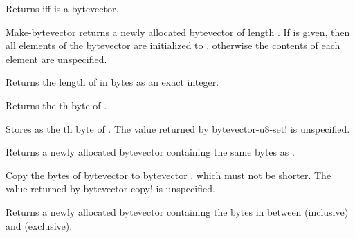 \begin{entry}{%
}

Returns \schtrue{} iff  is a bytevector.
\end{entry}

\begin{entry}{%
}

{\cf Make-bytevector} returns a newly allocated bytevector of
length .  If  is given, then all elements of the bytevector
are initialized to , otherwise the contents of each
element are unspecified.
\end{entry}

\begin{entry}{%
}

Returns the length of  in bytes as an exact integer.
\end{entry}

\begin{entry}{%
}

Returns the th byte of .
\end{entry}

\begin{entry}{%
}

Stores  as the th byte of .
The value returned by
{\cf bytevector-u8-set!} is unspecified.
\end{entry}

\begin{entry}{%
}

Returns a newly allocated bytevector containing the same bytes as
.
\end{entry}

\begin{entry}{%
}

Copy the bytes of bytevector  to bytevector , which must not be
shorter.  The value returned by {\cf bytevector-copy!} is unspecified.
\end{entry}

\begin{entry}{%
}

Returns a newly allocated bytevector containing the bytes in 
between  (inclusive) and 
(exclusive).
\end{entry}

